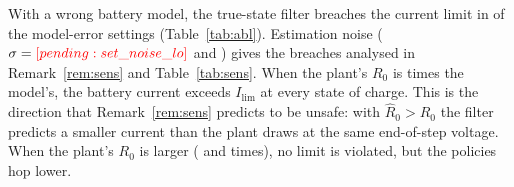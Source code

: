 With a wrong battery model, the true-state filter breaches the current limit in  of the  model-error settings (Table~\ref{tab:abl}). Estimation noise ($\sigma=\res{set_noise_lo}$ and ) gives the breaches analysed in Remark~\ref{rem:sens} and Table~\ref{tab:sens}. When the plant's $R_0$ is  times the model's, the battery current exceeds $I_{\lim}$ at every state of charge. This is the direction that Remark~\ref{rem:sens} predicts to be unsafe: with $\hat R_0 > R_0$ the filter predicts a smaller current than the plant draws at the same end-of-step voltage. When the plant's $R_0$ is larger ( and  times), no limit is violated, but the policies hop lower.

